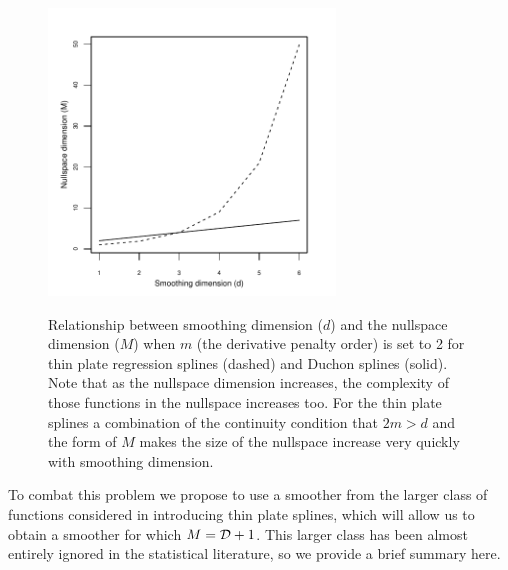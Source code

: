\documentclass[smallextended]{svjour3}       %
\begin{document}
\begin{figure}
\centering
\includegraphics[width=3in]{figs/nullspace-dim.pdf} \\
\caption{Relationship between smoothing dimension ($d$) and the nullspace dimension ($M$) when $m$ (the derivative penalty order) is set to 2 for thin plate regression splines (dashed) and Duchon splines (solid). Note that as the nullspace dimension increases, the complexity of those functions in the nullspace increases too. For the thin plate splines a combination of the continuity condition that $2m>d$ and the form of $M$ makes the size of the nullspace increase very quickly with smoothing dimension.}
\label{nullspace-dim}
\end{figure}


To combat this problem we propose to use a smoother from the larger class of functions considered in \cite{Duchon:1977tr} introducing thin plate splines, which will allow us to obtain a smoother for which $M = {\cal D} + 1$. This larger class has been almost entirely ignored in the statistical literature, so we provide a brief summary here. 
\end{document}
